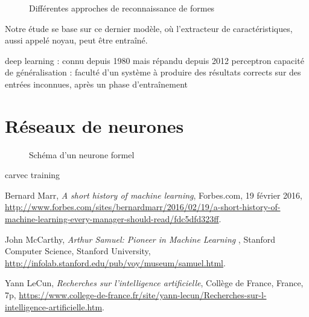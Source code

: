 \documentclass[a4paper,10pt]{report}
\begin{document}
\begin{figure}[!h]
    \centering
    \makebox[\textwidth]{}
    \caption{Différentes approches de reconnaissance de formes}
    \label{fig:c1p1s2}
\end{figure}

Notre étude se base sur ce dernier modèle, où l'extracteur de caractéristiques, aussi appelé noyau, peut être entraîné.

deep learning : connu depuis 1980 mais répandu depuis 2012
perceptron
capacité de généralisation : faculté d'un système à produire des résultats corrects sur des entrées inconnues, après un phase d'entraînement

\section{Réseaux de neurones}

\begin{figure}[H]
    \centering
    \makebox[\textwidth]{}
    \caption{Schéma d'un neurone formel}
    \label{fig:c1p2s1}
\end{figure}

\gls{carvec}
\gls{training}


\printglossaries


\begin{thebibliography}{9}
  Bernard Marr,
  \emph{A short history of machine learning},
  Forbes.com, 19 février 2016,
  \url{http://www.forbes.com/sites/bernardmarr/2016/02/19/a-short-history-of-machine-learning-every-manager-should-read/fdc5dfd323ff}.

  John McCarthy,
  \emph{Arthur Samuel: Pioneer in Machine Learning },
  Stanford Computer Science, Stanford University,
  \url{http://infolab.stanford.edu/pub/voy/museum/samuel.html}.


  Yann LeCun,
  \emph{Recherches sur l'intelligence artificielle},
  Collège de France, France,
  7p,
  \url{https://www.college-de-france.fr/site/yann-lecun/Recherches-sur-l-intelligence-artificielle.htm}.

\end{thebibliography}
\end{document}
